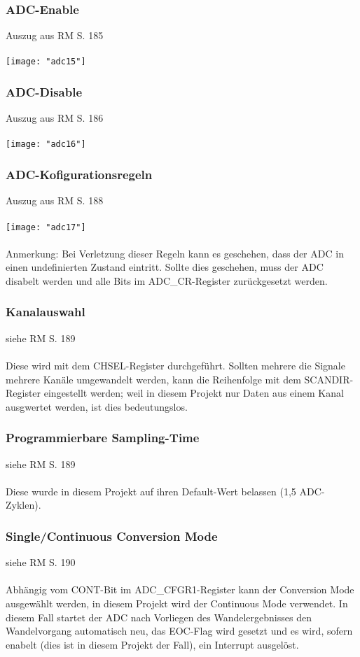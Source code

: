\documentclass[11pt]{report}
\begin{document}
			\subsubsection{ADC-Enable}
				Auszug aus RM S. 185\\
				\\\texttt{[image: "adc15"]}\\
			\subsubsection{ADC-Disable}
				Auszug aus RM S. 186\\
				\\\texttt{[image: "adc16"]}\\
			\subsubsection{ADC-Kofigurationsregeln}
				Auszug aus RM S. 188\\
				\\\texttt{[image: "adc17"]}\\
				\\Anmerkung: Bei Verletzung dieser Regeln kann es geschehen, dass der ADC in einen undefinierten Zustand eintritt. Sollte dies geschehen, muss der ADC disabelt werden und alle Bits im ADC\_CR-Register zurückgesetzt werden.
			\subsubsection{Kanalauswahl}
				siehe RM S. 189\\
				\\Diese wird mit dem CHSEL-Register durchgeführt. Sollten mehrere die Signale mehrere Kanäle umgewandelt werden, kann die Reihenfolge mit dem SCANDIR-Register eingestellt werden; weil in diesem Projekt nur Daten aus einem Kanal ausgwertet werden, ist dies bedeutungslos.
			\subsubsection{Programmierbare Sampling-Time}
				siehe RM S. 189\\
				\\Diese wurde in diesem Projekt auf ihren Default-Wert belassen (1,5 ADC-Zyklen).
			\subsubsection{Single/Continuous Conversion Mode}
				siehe RM S. 190\\
				\\Abhängig vom CONT-Bit im ADC\_CFGR1-Register kann der Conversion Mode ausgewählt werden, in diesem Projekt wird der Continuous Mode verwendet. In diesem Fall startet der ADC nach Vorliegen des Wandelergebnisses den Wandelvorgang automatisch neu, das EOC-Flag wird gesetzt und es wird, sofern enabelt (dies ist in diesem Projekt der Fall), ein Interrupt ausgelöst.
\end{document}
